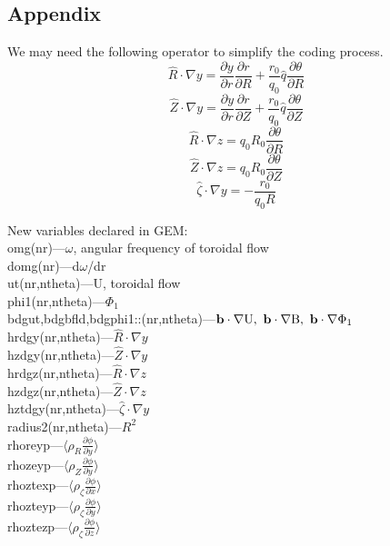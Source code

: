 \documentclass[12pt]{article}
\begin{document}
\begin{CJK*}{UTF8}{gbsn}
\newpage
\section*{Appendix}
We may need the following operator to simplify the coding process.
\begin{equation*}
    \hat{R}\cdot\nabla y = \frac{\partial y}{\partial r}\frac{\partial r}{\partial R} + \frac{r_0}{q_0}\hat{q}\frac{\partial \theta}{\partial R}
\end{equation*}
\begin{equation*}
    \hat{Z}\cdot\nabla y = \frac{\partial y}{\partial r}\frac{\partial r}{\partial Z} + \frac{r_0}{q_0}\hat{q}\frac{\partial \theta}{\partial Z}
\end{equation*}
\begin{equation*}
    \hat{R}\cdot\nabla z = q_0R_0\frac{\partial \theta}{\partial R}
\end{equation*}
\begin{equation*}
    \hat{Z}\cdot\nabla z = q_0R_0\frac{\partial \theta}{\partial Z}
\end{equation*}
\begin{equation*}
    \hat{\zeta}\cdot\nabla y = -\frac{r_0}{q_0R}
\end{equation*}

New variables declared in GEM:\\
omg(nr)---$\omega$, angular frequency of toroidal flow\\
domg(nr)---d$\omega$/dr\\
ut(nr,ntheta)---U, toroidal flow\\
phi1(nr,ntheta)---$\Phi_1$\\
bdgut,bdgbfld,bdgphi1::(nr,ntheta)---${\bf b}\cdot\nabla{\rm U},\ {\bf b}\cdot\nabla{\rm B},\ {\bf b}\cdot\nabla{\rm \Phi_1}$\\
hrdgy(nr,ntheta)---$\hat{R}\cdot\nabla y$\\
hzdgy(nr,ntheta)---$\hat{Z}\cdot\nabla y$\\
hrdgz(nr,ntheta)---$\hat{R}\cdot\nabla z$\\
hzdgz(nr,ntheta)---$\hat{Z}\cdot\nabla z$\\
hztdgy(nr,ntheta)---$\hat{\zeta}\cdot\nabla y$\\
radius2(nr,ntheta)---$R^2$\\
rhoreyp---$\big\langle\rho_R\frac{\partial\phi}{\partial y}\big\rangle$\\
rhozeyp---$\big\langle\rho_Z\frac{\partial\phi}{\partial y}\big\rangle$\\
rhoztexp---$\big\langle\rho_\zeta\frac{\partial\phi}{\partial x}\big\rangle$\\
rhozteyp---$\big\langle\rho_\zeta\frac{\partial\phi}{\partial y}\big\rangle$\\
rhoztezp---$\big\langle\rho_\zeta\frac{\partial\phi}{\partial z}\big\rangle$\\

\newpage


\end{CJK*}
\end{document}
